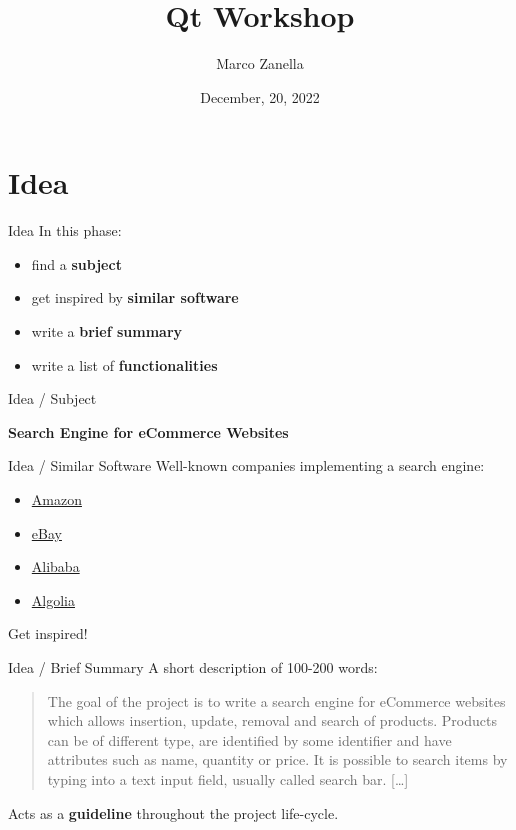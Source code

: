 \documentclass[11pt]{beamer}
\author{Marco Zanella}
\title{Qt Workshop}
\institute{University of Padova}
\date{December, 20, 2022}
\renewcommand{\emph}[1]{\textbf{#1}}
\begin{document}
\begin{frame}
 \titlepage
\end{frame}

\begin{frame}
 \tableofcontents
\end{frame}


\section{Idea}
\begin{frame}{Idea}
 In this phase:
 \begin{itemize}
  \item find a \emph{subject}
  \item get inspired by \emph{similar software}
  \item write a \emph{brief summary}
  \item write a list of \emph{functionalities}
 \end{itemize}
\end{frame}


\begin{frame}{Idea / Subject}
 \begin{center}
  \emph{Search Engine for eCommerce Websites}
 \end{center}
\end{frame}


\begin{frame}{Idea / Similar Software}
 Well-known companies implementing a search engine:
 \begin{itemize}
   \item \href{https://www.amazon.com}{Amazon}
   \item \href{https://www.ebay.com}{eBay}
   \item \href{https://www.alibaba.com}{Alibaba}
   \item \href{https://www.algolia.com}{Algolia}
 \end{itemize}
 Get inspired!
\end{frame}


\begin{frame}{Idea / Brief Summary}
 A short description of 100-200 words:
 
 \begin{quote}
  The goal of the project is to write a search engine for eCommerce websites which allows insertion, update, removal and search of products. Products can be of different type, are identified by some identifier and have attributes such as name, quantity or price. It is possible to search items by typing into a text input field, usually called search bar. [\ldots]
 \end{quote}
 
 Acts as a \emph{guideline} throughout the project life-cycle.
\end{frame}
\end{document}
